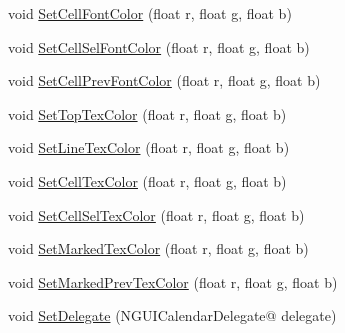 \begin{DoxyCompactItemize}
\item 
void \hyperlink{class_n_g_u_i_calendar_ad4f6090f433f634493c0df83ee034b54}{Set\+Cell\+Font\+Color} (float r, float g, float b)
\item 
void \hyperlink{class_n_g_u_i_calendar_a8c3d461f7bfbb7ced483cc789f91e30f}{Set\+Cell\+Sel\+Font\+Color} (float r, float g, float b)
\item 
void \hyperlink{class_n_g_u_i_calendar_a70eed7a5a854b5c61c71934a0d2c79ed}{Set\+Cell\+Prev\+Font\+Color} (float r, float g, float b)
\item 
void \hyperlink{class_n_g_u_i_calendar_a972a6e93be5d579453e4c5b4ec63dccb}{Set\+Top\+Tex\+Color} (float r, float g, float b)
\item 
void \hyperlink{class_n_g_u_i_calendar_afe228ce84ae92c12f268bdf3640eb01f}{Set\+Line\+Tex\+Color} (float r, float g, float b)
\item 
void \hyperlink{class_n_g_u_i_calendar_aa6eac197eabd8721ea72d605b0f0fdf6}{Set\+Cell\+Tex\+Color} (float r, float g, float b)
\item 
void \hyperlink{class_n_g_u_i_calendar_aac884137383e7c237598f717851c608d}{Set\+Cell\+Sel\+Tex\+Color} (float r, float g, float b)
\item 
void \hyperlink{class_n_g_u_i_calendar_a63fafea9e73725dd5e7d2dd94b32cb3b}{Set\+Marked\+Tex\+Color} (float r, float g, float b)
\item 
void \hyperlink{class_n_g_u_i_calendar_a69ea97a185ca0e3d3892b0e685224523}{Set\+Marked\+Prev\+Tex\+Color} (float r, float g, float b)
\item 
void \hyperlink{class_n_g_u_i_calendar_a1e13ebafd05cc39c40d7e1186992c74b}{Set\+Delegate} (N\+G\+U\+I\+Calendar\+Delegate@ delegate)
\end{DoxyCompactItemize}

